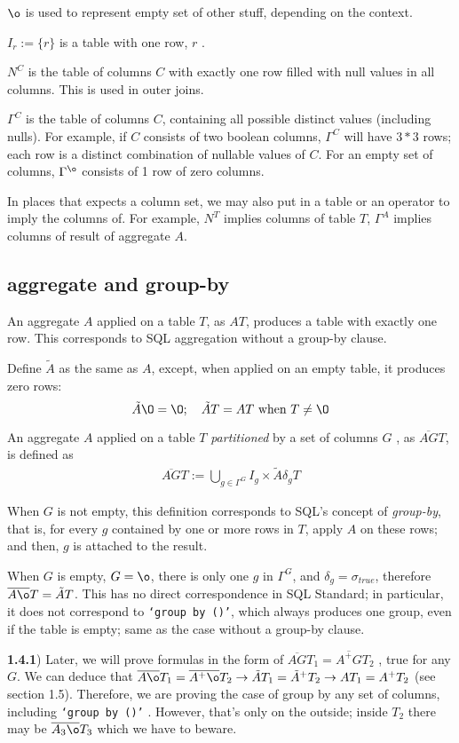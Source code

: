\documentclass[article]{article}
\newcommand{\U}{\bigcup}
\newcommand{\ag}[1]{\overline{#1}}
\newcommand{\EA}{\tilde{A}}
\begin{document}
$\o$ is used to represent empty set of other stuff, depending on the context.

$I_r := \{r\}$ is a table with one row, $r$ .

$N^C$ is the table of columns $C$ with exactly one row filled with null values in all columns.
This is used in outer joins. 
 

$\Gamma^C$ is the table of columns $C$, containing all possible distinct values (including nulls).
   For example, if $C$ consists of two boolean columns, $\Gamma^C$ will have $3*3$ rows;
   each row is a distinct combination of nullable values of $C$.
For an empty set of columns, $\Gamma^{\o}$  consists of 1 row of zero columns.

In  places that expects a column set, we may also put in a table or an operator
to imply the columns of. For example, $N^T$ implies columns of table $T$, 
$\Gamma^A$ implies columns of result of aggregate $A$.

\subsection{ aggregate and group-by }

An aggregate $A$ applied on a table $T$, as $AT$, produces a table with exactly one row.
This corresponds to SQL aggregation without a group-by clause.

Define $\EA$ as the same as $A$, except, when applied on an empty table, it produces zero rows:
$$\EA \O = \O ; \quad \EA T = AT \text{\,\,when\,\,} T\neq\O$$

An aggregate $A$ applied on a table $T$ {\it partitioned} by a set of columns $G$
, as $\ag{AG} T$, is defined as
\begin{align}
 \ag{AG} T := \U_{g\in \Gamma^G} I_g \times \EA \delta_g T
\end{align}

When $G$ is not empty, this definition corresponds to SQL's concept of {\it group-by}, that is,
for every $g$ contained by one or more rows in $T$, apply $A$ on these rows;
 and then, $g$ is attached to the result.

When $G$ is empty, $G=\o$, there is only one $g$ in $\Gamma^G$, and $\delta_g = \sigma_{true}$,
therefore $\ag{A\o}T=\EA T$. 
This has no direct correspondence in SQL Standard;
in particular, it does not correspond to {\tt `group by ()'}, which always produces one group,
even if the table is empty; same as the case without a group-by clause.

{\bf 1.4.1}) Later, we will prove formulas in the form of $\ag{A G} T_1 = \ag{A^+ G} T_2$ ,
true for any $G$. 
We can deduce that $\ag{A \o} T_1 = \ag{A^+ \o} T_2 
\to \EA T_1 = \EA^+ T_2 \to A T_1 = A^+ T_2$ (see section 1.5).
Therefore, we are proving the case of group by any set of columns, 
including {\tt `group by ()'} .
However, that's only on the outside; 
inside $T_2$ there may be $\ag{A_3 \o} T_3$ which we have to beware.
\end{document}
